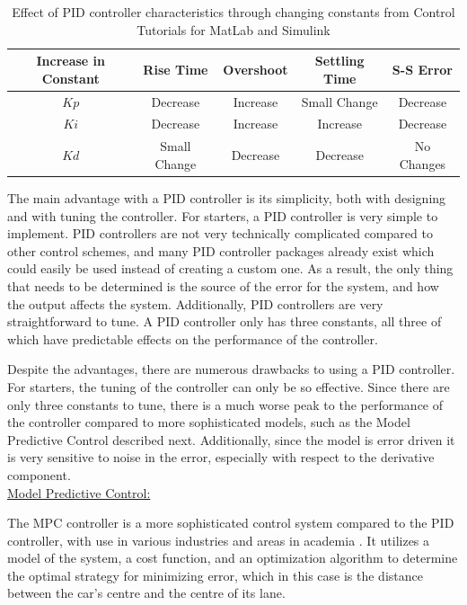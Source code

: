 \documentclass[titlepage,draft]{article}
\begin{document}
{\begin{table}[H]
	\centering
	\caption{Effect of PID controller characteristics through changing constants from Control Tutorials for MatLab and Simulink \cite{pid_characteristics}}
	\begin{tabular}{|c | c | c | c | c |}
		\hline
		Increase in Constant & Rise Time    & Overshoot & Settling Time & S-S Error  \\ [0.5ex]
		\hline
		\(Kp\)               & Decrease     & Increase  & Small Change  & Decrease   \\
		\hline
		\(Ki\)               & Decrease     & Increase  & Increase      & Decrease   \\
		\hline
		\(Kd\)               & Small Change & Decrease  & Decrease      & No Changes \\
		\hline
	\end{tabular}
	\label{tab:pidvals}
\end{table}

The main advantage with a PID controller is its simplicity, both with designing and with tuning the controller. For starters, a PID controller is very simple to implement. PID controllers are not very technically complicated compared to other control schemes, and many PID controller packages already exist which could easily be used instead of creating a custom one. As a result, the only thing that needs to be determined is the source of the error for the system, and how the output affects the system. Additionally, PID controllers are very straightforward to tune. A PID controller only has three constants, all three of which have predictable effects on the performance of the controller.

Despite the advantages, there are numerous drawbacks to using a PID controller. For starters, the tuning of the controller can only be so effective. Since there are only three constants to tune, there is a much worse peak to the performance of the controller compared to more sophisticated models, such as the Model Predictive Control described next. Additionally, since the model is error driven it is very sensitive to noise in the error, especially with respect to the derivative component.
\\

\underline{Model Predictive Control:}

The MPC controller is a more sophisticated control system compared to the PID controller, with use in various industries and areas in academia \cite{GARCIA1989335}. It utilizes a model of the system, a cost function, and an optimization algorithm to determine the optimal strategy for minimizing error, which in this case is the distance between the car's centre and the centre of its lane.

}
\end{document}
